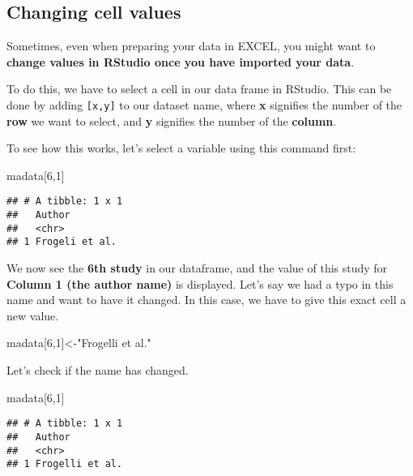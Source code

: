 \documentclass[]{book}
\newenvironment{Shaded}{\begin{snugshade}}{\end{snugshade}}
\newcommand{\DecValTok}[1]{\textcolor[rgb]{0.00,0.00,0.81}{#1}}
\newcommand{\StringTok}[1]{\textcolor[rgb]{0.31,0.60,0.02}{#1}}
\newcommand{\NormalTok}[1]{#1}
\theoremstyle{definition}
\theoremstyle{definition}
\theoremstyle{definition}
\theoremstyle{remark}
\begin{document}
\subsection{Changing cell values}\label{changing-cell-values}

Sometimes, even when preparing your data in EXCEL, you might want to
\textbf{change values in RStudio once you have imported your data}.

To do this, we have to select a cell in our data frame in RStudio. This
can be done by adding \texttt{{[}x,y{]}} to our dataset name, where
\textbf{x} signifies the number of the \textbf{row} we want to select,
and \textbf{y} signifies the number of the \textbf{column}.

To see how this works, let's select a variable using this command first:

\begin{Shaded}
\begin{Highlighting}[]
\NormalTok{madata[}\DecValTok{6}\NormalTok{,}\DecValTok{1}\NormalTok{]}
\end{Highlighting}
\end{Shaded}

\begin{verbatim}
## # A tibble: 1 x 1
##   Author        
##   <chr>         
## 1 Frogeli et al.
\end{verbatim}

We now see the \textbf{6th study} in our dataframe, and the value of
this study for \textbf{Column 1 (the author name)} is displayed. Let's
say we had a typo in this name and want to have it changed. In this
case, we have to give this exact cell a new value.

\begin{Shaded}
\begin{Highlighting}[]
\NormalTok{madata[}\DecValTok{6}\NormalTok{,}\DecValTok{1}\NormalTok{]<-}\StringTok{"Frogelli et al."}
\end{Highlighting}
\end{Shaded}

Let's check if the name has changed.

\begin{Shaded}
\begin{Highlighting}[]
\NormalTok{madata[}\DecValTok{6}\NormalTok{,}\DecValTok{1}\NormalTok{]}
\end{Highlighting}
\end{Shaded}

\begin{verbatim}
## # A tibble: 1 x 1
##   Author         
##   <chr>          
## 1 Frogelli et al.
\end{verbatim}
\end{document}
